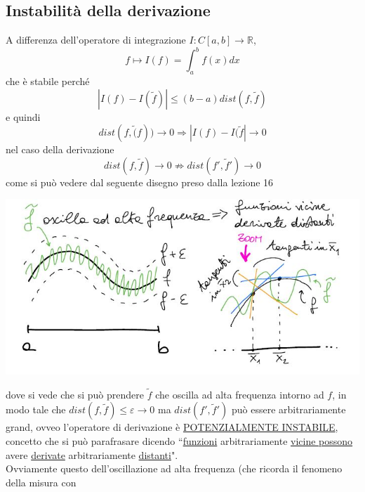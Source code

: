 \documentclass[12pt,a4paper]{article}
\begin{document}
\subsection{Instabilità della derivazione}
A differenza dell'operatore di integrazione $I:C[a,b]\rightarrow\mathbb{R}$,
\begin{equation*}
    f\longmapsto I(f)=\int_a^b f(x)dx
\end{equation*}
che è stabile perché
\begin{equation*}
    |I(f)-I(\tilde{f})|\leq(b-a)dist(f,\tilde{f})
\end{equation*}
e quindi 
\begin{equation*}
    dist(f,\tilde(f))\rightarrow0\Rightarrow|I(f)-I(\tilde{f}|\rightarrow0
\end{equation*}
nel caso della derivazione
\begin{equation*}
    dist(f,\tilde{f})\rightarrow0\nRightarrow dist(f',\tilde{f}')\rightarrow0
\end{equation*}
come si può vedere dal seguente disegno preso dalla lezione 16
\begin{center}
    \includegraphics[scale=0.6]{calcolo55.JPG}
\end{center}
dove si vede che si può prendere $\tilde{f}$ che oscilla ad alta frequenza intorno ad $f$, in modo tale che $dist(f,\tilde{f})\leq\varepsilon\rightarrow0$ ma $dist(f',\tilde{f}')$ può essere arbitrariamente grand, ovveo l'operatore di derivazione è \uline{POTENZIALMENTE INSTABILE}, concetto che si può parafrasare dicendo ``\uline{funzioni} arbitrariamente \uline{vicine possono} avere \uline{derivate} arbitrariamente \uline{distanti}".\\Ovviamente questo dell'oscillazione ad alta frequenza (che ricorda il fenomeno della misura con
\end{document}
